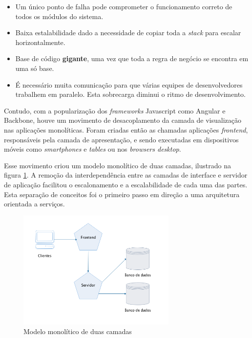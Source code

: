 \begin{itemize}
    \item Um único ponto de falha pode comprometer o funcionamento correto de todos os módulos do sistema.
    \item Baixa estalabilidade dado a necessidade de copiar toda a \textit{stack} para escalar horizontalmente.
    \item Base de código \textbf{gigante}, uma vez que toda a regra de negócio se encontra em uma só base.
    \item É necessário muita comunicação para que várias equipes de desenvolvedores trabalhem em paralelo. Esta sobrecarga diminui o ritmo de desenvolvimento.
\end{itemize}

Contudo, com a popularização dos \textit{frameworks} Javascript como Angular e Backbone, houve um movimento de desacoplamento da camada de visualização nas aplicações monolíticas. Foram criadas então as chamadas aplicações \textit{frontend}, responsáveis pela camada de apresentação, e sendo executadas em dispositivos móveis como \textit{smartphones} e \textit{tables} ou nos \textit{browsers desktop}. 

Esse movimento criou um modelo monolítico de duas camadas, ilustrado na figura \ref{fig:two-tier-monolithic}. A remoção da interdependência entre as camadas de interface e servidor de aplicação facilitou o escalonamento e a escalabilidade de cada uma das partes. Esta separação de conceitos foi o primeiro passo em direção a uma arquitetura orientada a serviços.

\begin{figure}[htbp]
    \centering
    \includegraphics[width=0.7\textwidth]{figuras/monolithic-2-tier.png}
    \caption{Modelo monolítico de duas camadas}
    \label{fig:two-tier-monolithic}
\end{figure}

